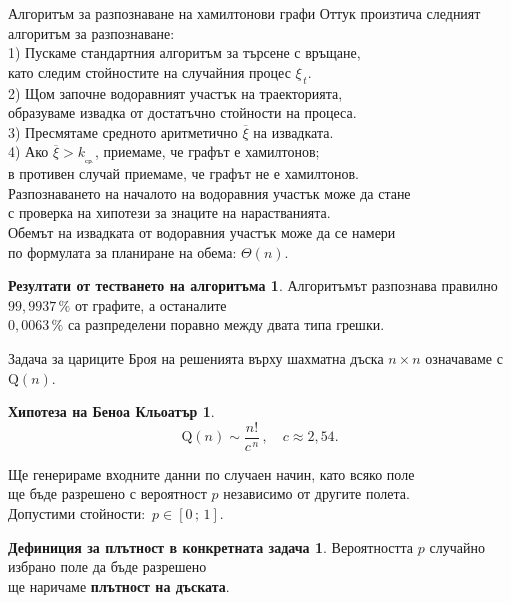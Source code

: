 \documentclass{beamer}
\theoremstyle{definition}
\newtheorem{defnplt}[thm]{Дефиниция за плътност в конкретната задача}
\newtheorem{graphalg}[thm]{Резултати от тестването на алгоритъма}
\newtheorem{hypqueens}[thm]{Хипотеза на Беноа Кльоатър}
\theoremstyle{remark}
\begin{document}
\begin{frame}{Алгоритъм за разпознаване на хамилтонови графи }
	Оттук произтича следният алгоритъм за разпознаване:\\
	1) Пускаме стандартния алгоритъм за търсене с връщане,\\
	\hspace*{\parindent}\phantom{1)} като следим стойностите
	на случайния процес \mbox{$\xi_{\,t}$.}\\
	2) Щом започне водоравният участък на траекторията,\\
	\hspace*{\parindent}\phantom{2)} образуваме извадка
	от достатъчно стойности на процеса.\\
	3) Пресмятаме средното аритметично $\overline{\xi}$ на извадката.\\
	4) Ако \mbox{$\overline{\xi}>k_{_{\scriptstyle\text{ср.}}}$,}
	приемаме, че графът е хамилтонов;\\
	\hspace*{\parindent}\phantom{4)} в противен случай
	приемаме, че графът не е хамилтонов.\\
	
	Разпознаването на началото на водоравния участък може да стане\\
	с проверка на хипотези за знаците на нарастванията.\\
	Обемът на извадката от водоравния участък може да се намери\\
	по формулата за планиране на обема: \mbox{$\Theta(n)$.}
	\begin{graphalg} 
		Алгоритъмът разпознава правилно $99,9937\,\%$ от графите,
		а останалите\\ $0,0063\,\%$ са разпределени поравно
		между двата типа грешки.
	\end{graphalg}	
\end{frame}
\begin{frame}{Задача за цариците}
	Броя на решенията върху шахматна дъска \mbox{$n \times n$}
	означаваме с \mbox{$\text{Q}(n)$.}
	\begin{hypqueens}
		\[\text{Q}(n)\sim\frac{n!}{c^{\,n}}\,,\quad c \approx 2,54.\]
	\end{hypqueens}
	Ще генерираме входните данни по случаен начин, като всяко поле\\
	ще бъде разрешено с вероятност $p$ независимо от другите полета.\\
	Допустими стойности: \,\mbox{$p\in[0\,;\,1]$.}	
	\begin{defnplt} 	
		Вероятността $p$ случайно избрано поле да бъде разрешено\\
		ще наричаме \textbf{плътност на дъската}.
	\end{defnplt}	
\end{frame}
\end{document}
